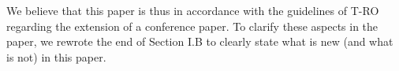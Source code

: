 \documentclass[a4paper]{article}
\begin{document}
We believe that this paper is thus in accordance with the guidelines of T-RO regarding the extension of a conference paper.
To clarify these aspects in the paper, we rewrote the end of Section I.B to clearly state what is new (and what is not) in this paper. 


\end{document}
